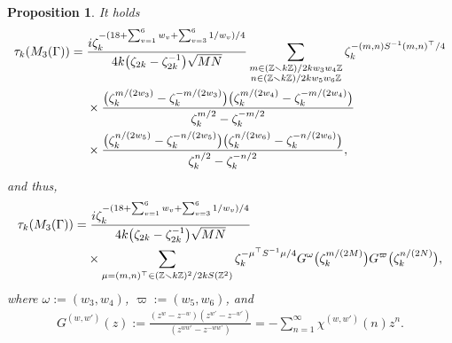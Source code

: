 \documentclass[11pt]{article}
\numberwithin{equation}{section}
\newcommand{\Z}{\mathbb{Z}}
\numberwithin{equation}{section}
\newtheorem{prop}[Theorem]{Proposition}
 { \theoremstyle{definition}
\newtheorem{dfn}[Theorem]{Definition}
\newtheorem{Note}[Theorem]{Note}
\newtheorem{ex}[Theorem]{Example}
\newtheorem{rem}[Theorem]{Remark}
\newtheorem{assump}[Theorem]{Assumption}
}
\newcommand{\trans}[1]{#1^\top}
\begin{document}
\begin{prop}\label{prop:WRT_inv}
	It holds
	\begin{align*}
		\tau_k(M_3(\Gamma))
		= {}& \frac{{\rm i} \zeta_{k}^{-(18 + \sum_{v=1}^{6}w_{v} + \sum_{v=3}^{6} 1/w_{v})/4}}{4k \big(\zeta_{2k}-\zeta_{2k}^{-1}\big) \sqrt{MN}}
\sum_{\substack{m \in (\Z \smallsetminus k\Z) / 2kw_3w_4\Z \\ n \in (\Z \smallsetminus k\Z) / 2kw_5w_6\Z}}		\zeta_k^{-(m, n) S^{-1} \trans{(m, n)}/4}
		\\
		&\times\frac{\big( \zeta_k^{m/(2w_3)} - \zeta_k^{-m/(2w_3)} \big) \big( \zeta_k^{m/(2w_4)} - \zeta_k^{-m/(2w_4)} \big)}{ \zeta_k^{m/2} - \zeta_k^{-m/2}}
\\
	&{} \times\frac{\big( \zeta_k^{n/(2w_5)} - \zeta_k^{-n/(2w_5)} \big) \big( \zeta_k^{n/(2w_6)} - \zeta_k^{-n/(2w_6)}\big)}{\zeta_k^{n/2} - \zeta_k^{-n/2}},
	\end{align*}
	and thus,\begin{gather*}
\begin{split}
&		\tau_k(M_3(\Gamma))
		=  \frac{{\rm i} \zeta_{k}^{-(18 + \sum_{v=1}^{6}w_{v} + \sum_{v=3}^{6} 1/w_{v})/4}}{4k \big(\zeta_{2k}-\zeta_{2k}^{-1}\big) \sqrt{MN}}
\\
&\hphantom{\tau_k(M_3(\Gamma))=}{}
\times\sum_{\mu = \trans{(m, n)} \in (\Z \smallsetminus k\Z)^2/2kS(\Z^2)}
\zeta_k^{-\trans{\mu} S^{-1} \mu/4}G^\omega\big(\zeta_k^{m/(2M)}\big) G^\varpi\big(\zeta_k^{n/(2N)}\big),
\end{split}
	\end{gather*}
where $ \omega := (w_3, w_4)$, $\varpi := (w_5, w_6) $, and\vspace{-1ex}
	\begin{gather*}
	G^{(w, w')}(z) :=
	\frac{(z^{w} - z^{-w})(z^{w'} - z^{-w'})}{(z^{ww'} - z^{-ww'})}
	=
	- \sum_{n=1}^{\infty} \chi^{(w, w')} (n) z^n.
	\end{gather*}
\end{prop}
\end{document}
